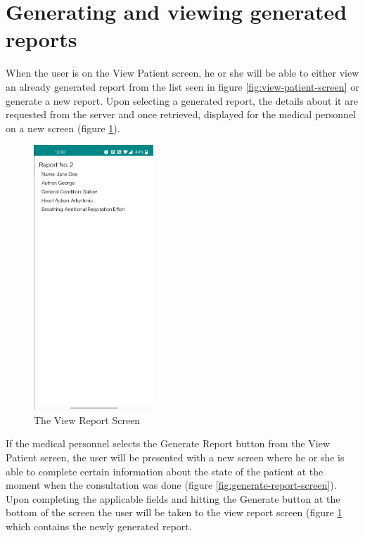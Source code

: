 \section{Generating and viewing generated reports}
\label{sec:ch5sec5}

\par When the user is on the View Patient screen, he or she will be able to either view an already generated report from the list seen in figure \ref{fig:view-patient-screen} or generate a new report. Upon selecting a generated report, the details about it are requested from the server and once retrieved, displayed for the medical personnel on a new screen (figure \ref{fig:view-report-screen}).

\begin{figure}
\centering
\includegraphics[width=0.4\textwidth]{figures/view_report_screen.png}
\caption{The View Report Screen}
\label{fig:view-report-screen}
\end{figure}

If the medical personnel selects the Generate Report button from the View Patient screen, the user will be presented with a new screen where he or she is able to complete certain information about the state of the patient at the moment when the consultation was done (figure \ref{fig:generate-report-screen}). Upon completing the applicable fields and hitting the Generate button at the bottom of the screen the user will be taken to the view report screen (figure \ref{fig:view-report-screen} which contains the newly generated report.

